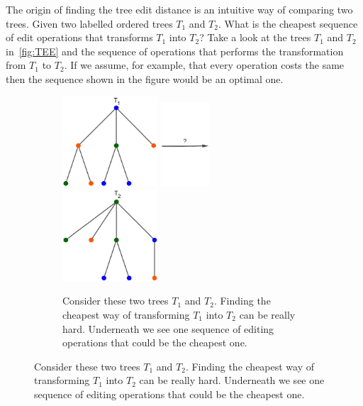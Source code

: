 The origin of finding the tree edit distance is an intuitive way of comparing two trees. Given two labelled ordered trees $T_1$ and $T_2$. What is the cheapest sequence of edit operations that transforms $T_1$ into $T_2$? Take a look at the trees $T_1$ and $T_2$ in~\ref{fig:TEE} and the sequence of operations that performs the transformation from $T_1$ to $T_2$. If we assume, for example, that every operation costs the same then the sequence shown in the figure would be an optimal one.
\begin{figure}[!h]
    \centering
    \begin{subfigure}[b]{\textwidth}
		\includegraphics[width=0.39\textwidth]{figures/TreeEditExample_1.jpg}
		\includegraphics[width=0.2\textwidth]{figures/TreeEditExample_1,5.jpg}
		\includegraphics[width=0.39\textwidth]{figures/TreeEditExample_2.jpg}
		\caption{Consider these two trees $T_1$ and $T_2$. Finding the cheapest way of transforming $T_1$ into $T_2$ can be really hard. Underneath we see one sequence of editing operations that could be the cheapest one.}
	\end{subfigure}

\end{figure}
